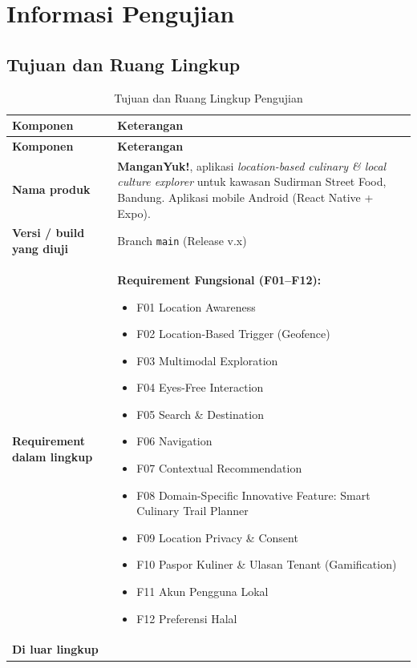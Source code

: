 \chapter{Informasi Pengujian}
\label{bab:informasi-pengujian}

\section{Tujuan dan Ruang Lingkup}

\begin{longtable}{|L{0.28}|L{0.72}|}
\caption{Tujuan dan Ruang Lingkup Pengujian}\\
\hline
{}\textbf{Komponen} & \textbf{Keterangan} \\ \hline
\endfirsthead
\hline
{}\textbf{Komponen} & \textbf{Keterangan} \\ \hline
\endhead
\textbf{Nama produk} & \textbf{ManganYuk!}, aplikasi \textit{location-based culinary \& local culture explorer} untuk kawasan Sudirman Street Food, Bandung. Aplikasi mobile Android (React Native + Expo). \\ \hline
\textbf{Versi / build yang diuji} & Branch \texttt{main} (Release v.x) \\ \hline
\textbf{Requirement dalam lingkup} &
\textbf{Requirement Fungsional (F01--F12):}
\begin{itemize}
  \item F01 Location Awareness
  \item F02 Location-Based Trigger (Geofence)
  \item F03 Multimodal Exploration
  \item F04 Eyes-Free Interaction
  \item F05 Search \& Destination
  \item F06 Navigation
  \item F07 Contextual Recommendation
  \item F08 Domain-Specific Innovative Feature: Smart Culinary Trail Planner
  \item F09 Location Privacy \& Consent
  \item F10 Paspor Kuliner \& Ulasan Tenant (Gamification)
  \item F11 Akun Pengguna Lokal
  \item F12 Preferensi Halal
\end{itemize} \\ \hline
\textbf{Di luar lingkup} &

\end{longtable}
